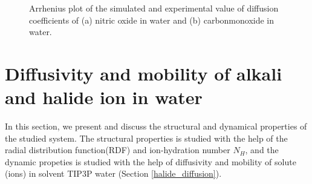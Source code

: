 \begin{table}[H]
 \centering
 \caption[ Activation Energy for diffusion of the studied systems.] { Activation Energy for diffusion  of the studied systems ( NO, CO, N2 in water)  and the corresponding experimental values.}
   \label{Activation_energy}
 \end{table}
 
 \begin{figure}[h!]
 \centering
   \caption[Arrhenius plot of the simulated  and experimental value of diffusion coefficients of    nitric oxide and carbonmonoxide in water.]{Arrhenius plot of the simulated  and experimental value of diffusion coefficients of  (a) nitric oxide in water and (b) carbonmonoxide in water.}
 \label{arrenewsplotall}
 \end{figure}
 


\section{Diffusivity and mobility of alkali and halide ion in water}
\label{ions}
In this section, we present and discuss the structural and dynamical properties of the studied system. The structural properties is studied with the help of  the radial distribution function(RDF) and ion-hydration number $N_H$, and the dynamic propeties is studied with the help of   diffusivity and mobility  of solute (ions) in   solvent TIP3P water (Section \ref{halide_diffusion}). 


